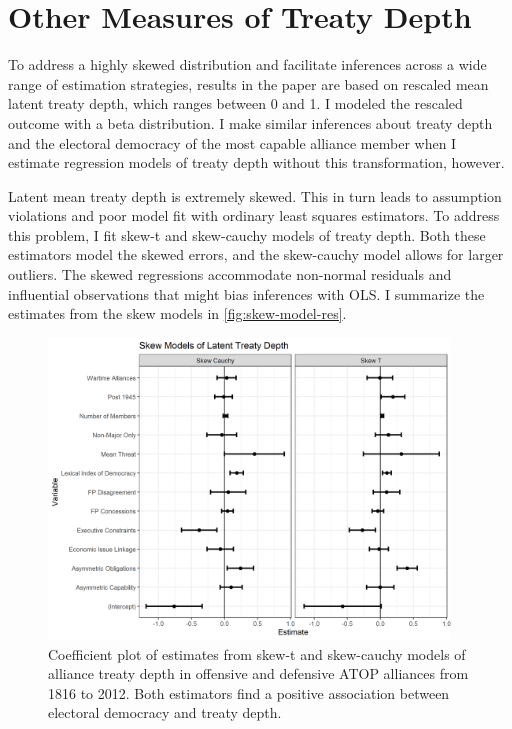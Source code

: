 \documentclass[12pt]{article}
\begin{document}
\section{Other Measures of Treaty Depth}



To address a highly skewed distribution and facilitate inferences across a wide range of estimation strategies, results in the paper are based on rescaled mean latent treaty depth, which ranges between 0 and 1. 
I modeled the rescaled outcome with a beta distribution. 
I make similar inferences about treaty depth and the electoral democracy of the most capable alliance member when I estimate regression models of treaty depth without this transformation, however. 


Latent mean treaty depth is extremely skewed. 
This in turn leads to assumption violations and poor model fit with ordinary least squares estimators. 
To address this problem, I fit skew-t and skew-cauchy models of treaty depth.
Both these estimators model the skewed errors, and the skew-cauchy model allows for larger outliers.   
The skewed regressions accommodate non-normal residuals and influential observations that might bias inferences with OLS. 
I summarize the estimates from the skew models in \autoref{fig:skew-model-res}. 


\begin{figure}[htbp]
	\centering
		\includegraphics[width=0.95\textwidth]{skew-model-res.png}
	\caption{Coefficient plot of estimates from skew-t and skew-cauchy models of alliance treaty depth in offensive and defensive ATOP alliances from 1816 to 2012. Both estimators find a positive association between electoral democracy and treaty depth.}
	\label{fig:skew-model-res}
\end{figure} 
\end{document}
